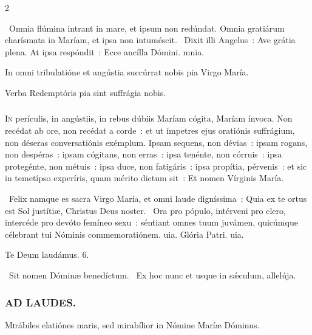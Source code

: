 \documentclass[9pt,twoside]{extarticle}
\begin{document}
\begin{multicols}{2}
\begin{tightlist}{}
\item {}~Omnia flúmina intrant in mare, et ipsum non redúndat. \textred{*} Omnia gratiárum charísmata in Maríam, et ipsa non intuméscit. ~Dixit illi Angelus~: Ave grátia plena. At ipsa respóndit~: Ecce ancílla Dómini. mnia.
\item {\small {} In omni tribulatióne et angústia succúrrat nobis pia Virgo María.}
\item {\small {}}
\item {\small {} Verba Redemptóris pia sint suffrágia nobis.}
\end{tightlist}

\subsubsection*{\center {}}
\lettrine{I}n perículis, in angústiis, in rebus dúbiis Maríam cógita, Maríam ínvoca. Non recédat ab ore, non recédat a corde~: et ut ímpetres ejus oratiónis suffrágium, non déseras conversatiónis exémplum. Ipsam sequens, non dévias~: ipsam rogans, non despéras~: ipsam cógitans, non erras~: ipsa tenénte, non córruis~: ipsa protegénte, non métuis~: ipsa duce, non fatigáris~: ipsa propítia, pérvenis~: et sic in temetípso experíris, quam mérito dictum sit~: Et nomen Vírginis María.

\begin{tightlist}{}
\item {}~Felix namque es sacra Virgo María, et omni laude digníssima~: \textred{*} Quia ex te ortus est Sol justítiæ, Christus Deus noster. ~Ora pro pópulo, intérveni pro clero, intercéde pro devóto femíneo sexu~: séntiant omnes tuum juvámen, quicúmque célebrant tui Nóminis commemoratiónem. uia. Glória Patri. uia.
\item Te Deum laudámus. 6.
\item {}~Sit nomen Dóminæ benedíctum. ~Ex hoc nunc et usque in sǽculum, allelúja.
\end{tightlist}

\subsubsection*{\center \textsc{AD LAUDES.}}
\begin{center}\end{center}
\lettrine{M}irábiles elatiónes maris, sed mirabílior in Nómine Maríæ Dóminus.


\end{multicols}
\end{document}

